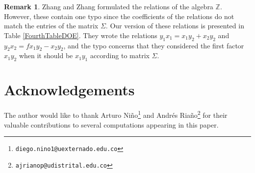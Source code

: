 \documentclass{amsart}
\theoremstyle{definition}
\newtheorem{remark}[theorem]{Remark}
\theoremstyle{remark}
\numberwithin{equation}{section}
\begin{document}
\begin{landscape}
\begin{remark} Zhang and Zhang \cite[Subcase 4.4.4]{ZhangZhang2009} formulated the relations of the algebra $\mathbb{Z}$. However, these contain one typo since the coefficients of the relations do not match the entries of the matrix $\Sigma$. Our version of these relations is presented in Table \ref{FourthTableDOE}. They wrote the relations $y_1x_1 = x_1y_2+x_2y_2$ and $y_2x_2=fx_1y_2-x_2y_2$, and the typo concerns that they considered the first factor $x_1y_2$ when it should be $x_1y_1$ according to matrix $\Sigma$.
\end{remark}
\end{landscape}

\section*{Acknowledgements}
The author would like to thank Arturo Niño\footnote{\texttt{diego.nino1@uexternado.edu.co}} and Andrés Riaño\footnote{\texttt{ajrianop@udistrital.edu.co}} for their valuable contributions to several computations appearing in this paper.
\end{document}
